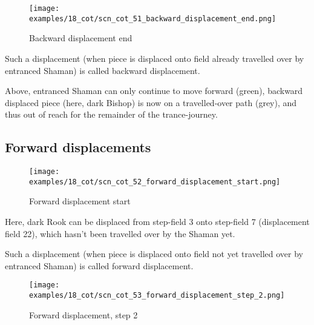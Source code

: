 \clearpage %

\noindent
\begin{figure}[!h]
\texttt{[image: examples/18\_cot/scn\_cot\_51\_backward\_displacement\_end.png]}
\caption{Backward displacement end}
\label{fig:scn_cot_51_backward_displacement_end}
\end{figure}

Such a displacement (when piece is displaced onto field already travelled over
by entranced Shaman) is called backward displacement.

Above, entranced Shaman can only continue to move forward (green), backward
displaced piece (here, dark Bishop) is now on a travelled-over path (grey),
and thus out of reach for the remainder of the trance-journey.

\clearpage %

\subsection*{Forward displacements}
\label{sec:Conquest of Tlalocan/Trance-journey/Forward displacements}

\vspace*{-1.0\baselineskip}
\noindent
\begin{figure}[!h]
\texttt{[image: examples/18\_cot/scn\_cot\_52\_forward\_displacement\_start.png]}
\caption{Forward displacement start}
\label{fig:scn_cot_52_forward_displacement_start}
\end{figure}

Here, dark Rook can be displaced from step-field 3 onto step-field 7 (displacement
field 22), which hasn't been travelled over by the Shaman yet.

Such a displacement (when piece is displaced onto field not yet travelled over by
entranced Shaman) is called forward displacement.

\clearpage %

\noindent
\begin{figure}[!h]
\texttt{[image: examples/18\_cot/scn\_cot\_53\_forward\_displacement\_step\_2.png]}
\caption{Forward displacement, step 2}
\label{fig:scn_cot_53_forward_displacement_step_2}
\end{figure}

